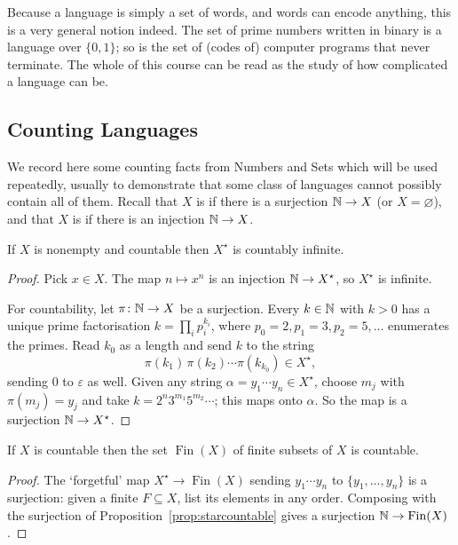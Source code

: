 \documentclass[a4paper]{scrartcl}
\newcommand{\Fin}{\operatorname{Fin}}
\newcommand{\eps}{\varepsilon}
\begin{document}
Because a language is simply a set of words, and words can encode anything, this is a very general notion indeed. The set of prime numbers written in binary is a language over $\{0,1\}$; so is the set of (codes of) computer programs that never terminate. The whole of this course can be read as the study of how complicated a language can be.

\subsection{Counting Languages}

We record here some counting facts from Numbers and Sets which will be used repeatedly, usually to demonstrate that some class of languages cannot possibly contain all of them. Recall that $X$ is  if there is a surjection $\mathbb{N} \to X$ (or $X = \varnothing$), and that $X$ is  if there is an injection $\mathbb{N} \to X$.

\begin{proposition}\label{prop:starcountable}
	If $X$ is nonempty and countable then $X^\star$ is countably infinite.
\end{proposition}

\begin{proof}
	Pick $x \in X$. The map $n \mapsto x^n$ is an injection $\mathbb{N} \to X^\star$, so $X^\star$ is infinite.

	For countability, let $\pi \colon \mathbb{N} \to X$ be a surjection. Every $k \in \mathbb{N}$ with $k > 0$ has a unique prime factorisation $k = \prod_{i} p_i^{k_i}$, where $p_0 = 2, p_1 = 3, p_2 = 5, \dots$ enumerates the primes. Read $k_0$ as a length and send $k$ to the string
	$$\pi(k_1)\,\pi(k_2)\cdots\pi(k_{k_0}) \in X^\star,$$
	sending $0$ to $\eps$ as well. Given any string $\alpha = y_1\cdots y_n \in X^\star$, choose $m_j$ with $\pi(m_j) = y_j$ and take $k = 2^n 3^{m_1} 5^{m_2} \cdots$; this maps onto $\alpha$. So the map is a surjection $\mathbb{N} \to X^\star$.
\end{proof}

\begin{proposition}\label{prop:fincountable}
	If $X$ is countable then the set $\Fin(X)$ of finite subsets of $X$ is countable.
\end{proposition}

\begin{proof}
	The `forgetful' map $X^\star \to \Fin(X)$ sending $y_1\cdots y_n$ to $\{y_1, \dots, y_n\}$ is a surjection: given a finite $F \subseteq X$, list its elements in any order. Composing with the surjection of Proposition~\ref{prop:starcountable} gives a surjection $\N \to \Fin(X)$.
\end{proof}
\end{document}

